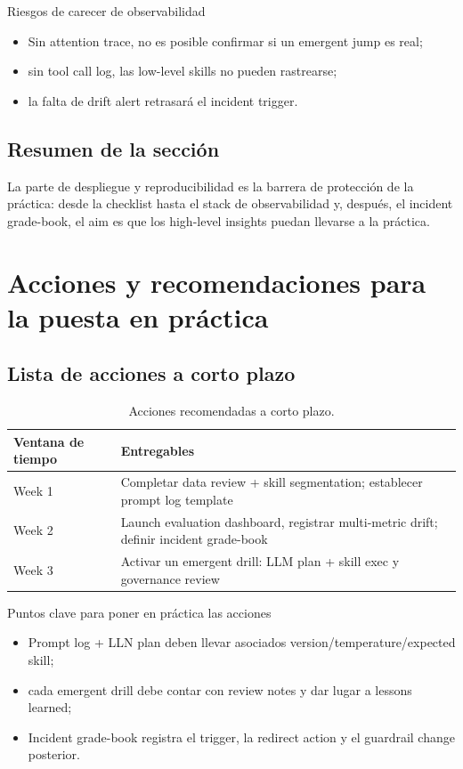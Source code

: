 \documentclass[a4paper]{article}
\begin{document}
\begin{warningbox}{Riesgos de carecer de observabilidad}
\begin{itemize}
    \item Sin attention trace, no es posible confirmar si un emergent jump es real;
    \item sin tool call log, las low-level skills no pueden rastrearse;
    \item la falta de drift alert retrasará el incident trigger.
\end{itemize}
\end{warningbox}

\subsection{Resumen de la sección}

La parte de despliegue y reproducibilidad es la barrera de protección de la práctica: desde la checklist hasta el stack de observabilidad y, después, el incident grade-book, el aim es que los high-level insights puedan llevarse a la práctica.

\section{Acciones y recomendaciones para la puesta en práctica}

\subsection{Lista de acciones a corto plazo}

\begin{table}[H]
\centering
\begin{tabular}{p{3cm}p{6cm}}
\toprule
Ventana de tiempo & Entregables \\
\midrule
Week 1 & Completar data review + skill segmentation; establecer prompt log template \\
Week 2 & Launch evaluation dashboard, registrar multi-metric drift; definir incident grade-book \\
Week 3 & Activar un emergent drill: LLM plan + skill exec y governance review \\
\bottomrule
\end{tabular}
\caption{Acciones recomendadas a corto plazo.}
\end{table}

\begin{importantbox}{Puntos clave para poner en práctica las acciones}
\begin{itemize}
    \item Prompt log + LLN plan deben llevar asociados version/temperature/expected skill;
    \item cada emergent drill debe contar con review notes y dar lugar a lessons learned;
    \item Incident grade-book registra el trigger, la redirect action y el guardrail change posterior.
\end{itemize}
\end{importantbox}
\end{document}
